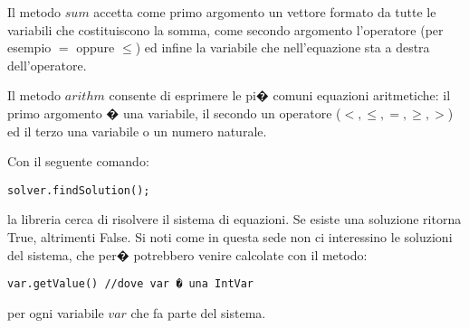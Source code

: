Il metodo $sum$ accetta come primo argomento un vettore formato da tutte le variabili che costituiscono la somma, come secondo argomento l'operatore (per esempio $=$ oppure $\le$) ed infine la variabile che nell'equazione sta a destra dell'operatore.

Il metodo $arithm$ consente di esprimere le pi� comuni equazioni aritmetiche: il primo argomento � una variabile, il secondo un operatore ($<,\le,=,\ge,>$) ed il terzo una variabile o un numero naturale.

Con il seguente comando: 
\begin{lstlisting}
solver.findSolution();
\end{lstlisting}
la libreria cerca di risolvere il sistema di equazioni. Se esiste una soluzione ritorna True, altrimenti False. Si noti come in questa sede non ci interessino le soluzioni del sistema, che per� potrebbero venire calcolate con il metodo:
\begin{lstlisting}
var.getValue() //dove var � una IntVar
\end{lstlisting}
per ogni variabile $var$ che fa parte del sistema.

